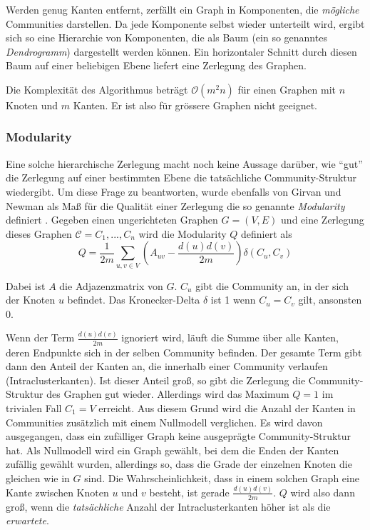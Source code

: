 Werden genug Kanten entfernt, zerfällt ein Graph in Komponenten, die
\emph{mögliche} Communities darstellen. Da jede Komponente selbst
wieder unterteilt wird, ergibt sich so eine Hierarchie von
Komponenten, die als Baum (ein so genanntes \emph{Dendrogramm})
dargestellt werden können. Ein horizontaler Schnitt durch diesen
Baum auf einer beliebigen Ebene liefert eine Zerlegung des Graphen.

Die Komplexität des Algorithmus beträgt $\mathcal{O}(m^2n)$ für
einen Graphen mit $n$ Knoten und $m$ Kanten. Er ist also für
grössere Graphen nicht geeignet.

\subsubsection{Modularity}
\label{sec:modularity}

Eine solche hierarchische Zerlegung macht noch keine Aussage
darüber, wie "`gut"' die Zerlegung auf einer bestimmten Ebene die
tatsächliche Community-Struktur wiedergibt. Um diese Frage zu
beantworten, wurde ebenfalls von Girvan und Newman als Ma{\ss} für die
Qualität einer Zerlegung die so genannte \emph{Modularity}
definiert \cite{Newman2004}. Gegeben einen ungerichteten Graphen $G=(V,
E)$ und eine Zerlegung dieses Graphen $\mathcal{C} = C_1, ..., C_n$
wird die Modularity $Q$ definiert als
\begin{equation}
  \label{eq:modularity}
  Q =
  \frac{1}{2m}\sum_{u, v \in
    V}\left(A_{uv}-\frac{d(u)d(v)}{2m}\right)\delta\left(C_u, C_v\right)
\end{equation}

Dabei ist $A$ die Adjazenzmatrix von $G$. $C_u$ gibt die Community an,
in der sich der Knoten $u$ befindet. Das Kronecker-Delta $\delta$
ist 1 wenn $C_u = C_v$ gilt, ansonsten 0.

Wenn der Term $\frac{d(u)d(v)}{2m}$ ignoriert wird, läuft die Summe
über alle Kanten, deren Endpunkte sich in der selben Community
befinden. Der gesamte Term gibt dann den Anteil der Kanten an, die
innerhalb einer Community verlaufen (Intraclusterkanten). Ist dieser Anteil groß, so gibt
die Zerlegung die Community-Struktur des Graphen gut
wieder. Allerdings wird das Maximum $Q = 1$ im trivialen Fall $C_1 =
V$ erreicht. Aus diesem Grund wird die Anzahl der Kanten in
Communities zusätzlich mit einem Nullmodell verglichen. Es wird
davon ausgegangen, dass ein zufälliger Graph keine ausgeprägte
Community-Struktur hat. Als Nullmodell wird ein Graph gewählt, bei
dem die Enden der Kanten zufällig gewählt wurden, allerdings so,
dass die Grade der einzelnen Knoten die gleichen wie in $G$ sind.  Die
Wahrscheinlichkeit, dass in einem solchen Graph eine Kante zwischen
Knoten $u$ und $v$ besteht, ist gerade $\frac{d(u)d(v)}{2m}$. $Q$ wird
also dann groß, wenn die \emph{tatsächliche} Anzahl der
Intraclusterkanten höher ist als die \emph{erwartete}.

